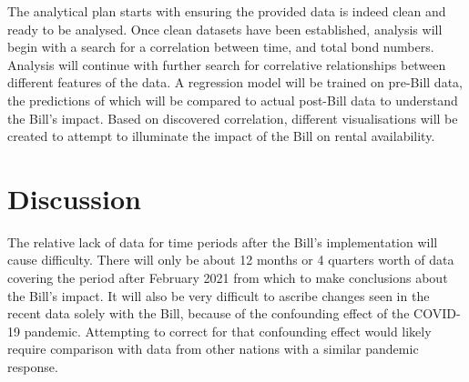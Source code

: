 \documentclass[11pt, oneside, british]{article}
\begin{document}
The analytical plan starts with ensuring the provided data is indeed clean and ready to be analysed.
Once clean datasets have been established, analysis will begin with a search for a correlation between time, and total bond numbers.
Analysis will continue with further search for correlative relationships between different features of the data.
A regression model will be trained on pre-Bill data, the predictions of which will be compared to actual post-Bill data to understand the Bill's impact.
Based on discovered correlation, different visualisations will be created to attempt to illuminate the impact of the Bill on rental availability.

\section{Discussion}

The relative lack of data for time periods after the Bill's implementation will cause difficulty.
There will only be about 12 months or 4 quarters worth of data covering the period after February 2021 from which to make conclusions about the Bill's impact.
It will also be very difficult to ascribe changes seen in the recent data solely with the Bill, because of the confounding effect of the COVID-19 pandemic.
Attempting to correct for that confounding effect would likely require comparison with data from other nations with a similar pandemic response.
\end{document}
